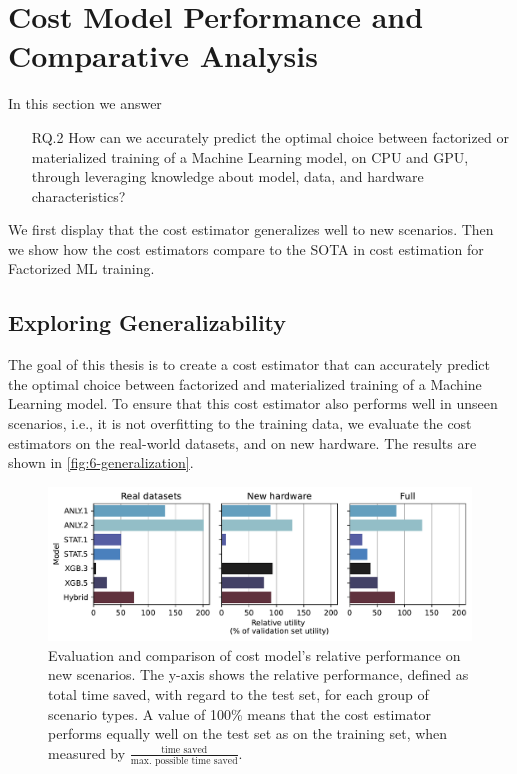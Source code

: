 \section{Cost Model Performance and Comparative Analysis}
\label{sec:eval-model-evaluation}

In this section we answer
\begin{itemize}
    \item[RQ.2] How can we accurately predict the optimal choice between factorized or materialized training of a Machine Learning model, on CPU and GPU, through leveraging knowledge about model, data, and hardware characteristics?
\end{itemize}

We first display that the cost estimator generalizes well to new scenarios. Then we show how the cost estimators compare to the SOTA in cost estimation for Factorized ML training.

\subsection{Exploring Generalizability}
\label{subsec:6-generalizability}
The goal of this thesis is to create a cost estimator that can accurately predict the optimal choice between factorized and materialized training of a Machine Learning model. To ensure that this cost estimator also performs well in unseen scenarios, i.e., it is not overfitting to the training data, we evaluate the cost estimators on the real-world datasets, and on new hardware. The results are shown in \autoref{fig:6-generalization}.

\begin{figure}
    \centering
    \includegraphics[width=\linewidth]{chapters/06_evaluation/figures/eval_generalization.pdf}
    \caption[Evaluation of performance on new scenarios]{Evaluation and comparison of cost model's relative performance on new scenarios. The y-axis shows the relative performance, defined as total time saved, with regard to the test set, for each group of scenario types. A value of 100\% means that the cost estimator performs equally well on the test set as on the training set, when measured by $\frac{\text{time saved}}{\text{max. possible time saved}}$.}
    \label{fig:6-generalization}
\end{figure}

